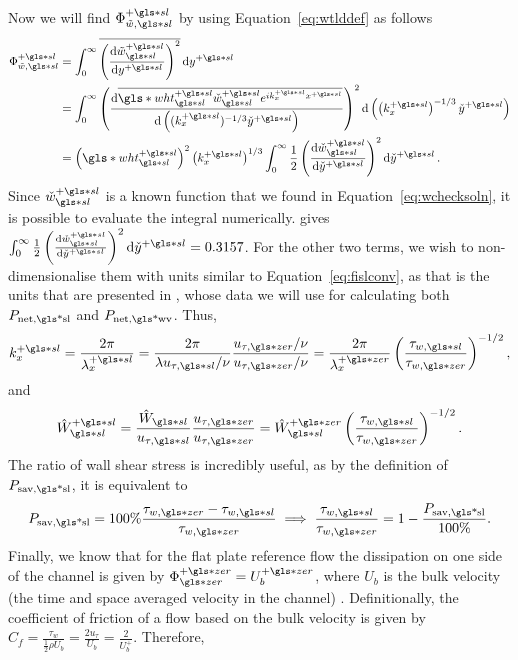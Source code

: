 Now we will find $\Phi _{\tilde{w},\gls*{sl}}\ps$ by using Equation~\eqref{eq:wtlddef} as follows
\begin{align}
	\Phi _{\tilde{w},\gls*{sl}}\ps &= \int_{0}^{\infty} \overline{\left( \dv{\tilde{w}\ssl\ps}{y\ps}  \right) ^2} \dd{y\ps}   \\
				       &= \int_{0}^{\infty} \left( \dv{\overline{\gls*{wht}\ps\ssl\check{w}\ssl\ps e^{ik\ps_x x\ps}}}{\left((k_x\ps)^{-1 /3}\check{y}\ps\right)}  \right) ^2 \dd{\left(\left(k_x\ps\right)^{-1 /3}\check{y}\ps\right)}   \\
				       &= \left(\gls*{wht}\ps\ssl\right)^2\left(k_x\ps\right)^{1 /3}\int_{0}^{\infty}\frac{1}{2} \left( \dv{\check{w}\ssl\ps}{\check{y}\ps}  \right) ^2 \dd{\check{y}\ps} \label{eq:fislps}
.\end{align}
Since $\check{w}\ssl\ps$ is a known function that we found in Equation~\eqref{eq:wchecksoln}, it is possible to evaluate the integral numerically. \textcite{chernyshenko2013} gives $\int_{0}^{\infty}  \frac{1}{2} \left( \dv{\check{w}\ssl\ps}{\check{y}\ps}  \right) ^2 \dd{\check{y}\ps} = 0.3157$. For the other two terms, we wish to non-dimensionalise them with \pz units similar to Equation~\eqref{eq:fislconv}, as that is the units that are presented in \textcite{viotti2009}, whose data we will use for calculating both $P_\text{net,\gls*{sl}} $ and $P_\text{net,\gls*{wv}} $. Thus,
\begin{equation}
	k_x\ps=\frac{2\pi}{\lambda_x\ps}=\frac{2\pi}{\lambda u_{\tau,\gls*{sl}}/\nu}\frac{u_{\tau,\gls*{zer}}/\nu}{u_{\tau,\gls*{zer}}/\nu}=\frac{2\pi}{\lambda_x\pz}\left( \frac{\tau_{w,\gls*{sl}}}{\tau_{w,\gls*{zer}}} \right) ^{-1 /2}\label{eq:kxslconv}
,\end{equation}
and
\begin{equation}
	\hat{W}\ps\ssl=\frac{\hat{W}\ssl}{u_{\tau,\gls*{sl}}}\frac{u_{\tau,\gls*{zer}}}{u_{\tau,\gls*{zer}}}=\hat{W}\ssl\pz\left( \frac{\tau_{w,\gls*{sl}}}{\tau_{w,\gls*{zer}}} \right) ^{-1 /2}\label{eq:whtslconv}
.\end{equation}
The ratio of wall shear stress is incredibly useful, as by the definition of $P_\text{sav,\gls*{sl}} $, it is equivalent to
\begin{equation}
	P_\text{sav,\gls*{sl}}=100\%\frac{\tau_{w,\gls*{zer}}-\tau_{w,\gls*{sl}}}{\tau_{w,\gls*{zer}}}\implies \frac{\tau_{w,\gls*{sl}}}{\tau_{w,\gls*{zer}}}= 1-\frac{ P_\text{sav,\gls*{sl}} }{100\%} \label{eq:taupsavconv}
.\end{equation}
Finally, we know that for the flat plate reference flow the dissipation on one side of the channel is given by	$\Phi \pz\zz = U_b\pz$, where $U_b$ is the bulk velocity (the time and space averaged velocity in the channel) \cite{chernyshenko2013}. Definitionally, the coefficient of friction of a flow based on the bulk velocity is given by $C_f=\frac{\tau_w}{\frac{1}{2}\rho U_b}=\frac{2u_{\tau}}{U_b}=\frac{2}{U_b^{+}}$. Therefore,
